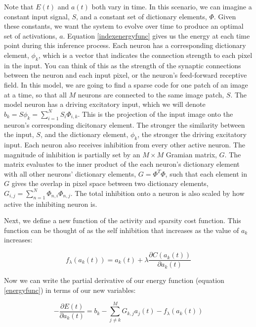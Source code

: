 Note that $E(t)$ and $a(t)$ both vary in time. In this scenario, we can imagine a constant input signal, $S$, and a constant set of dictionary elements, $\Phi$. Given these constants, we want the system to evolve over time to produce an optimal set of activations, $a$. Equation \eqref{indexenergyfunc} gives us the energy at each time point during this inference process. Each neuron has a corresponding dictionary element, $\phi_{k}$, which is a vector that indicates the connection strength to each pixel in the input. You can think of this as the strength of the synaptic connections between the neuron and each input pixel, or the neuron's feed-forward receptive field. In this model, we are going to find a sparse code for one patch of an image at a time, so that all $M$ neurons are connected to the same image patch, $S$. The model neuron has a driving excitatory input, which we will denote $b_{k} = S\phi_{k} = \sum_{i=1}^{N}S_{i} \Phi_{i,k}$. This is the projection of the input image onto the neuron's corresponding dicitonary element. The stronger the similarity between the input, $S$, and the dictionary element, $\phi_{k}$, the stronger the driving excitatory input. Each neuron also receives inhibition from every other active neuron. The magnitude of inhibition is partially set by an $M \times M$ Gramian matrix, $G$. The matrix evaluates to the inner product of the each neuron's dictionary element with all other neurons' dictionary elements, $G = \Phi^T\Phi$, such that each element in $G$ gives the overlap in pixel space between two dictionary elements, $G_{i,j} = \sum\limits_{n=1}^{N} \Phi_{n,i}\Phi_{n,j}$. The total inhibition onto a neuron is also scaled by how active the inhibiting neuron is.

Next, we define a new function of the activity and sparsity cost function. This function can be thought of as the self inhibition that increases as the value of $a_{k}$ increases:

\begin{equation}
f_{\lambda}(a_{k}(t)) = a_{k}(t) + \lambda \frac{\partial C(a_{k}(t))}{\partial a_{k}(t)}
\label{hopfieldtfunc}
\end{equation}

Now we can write the partial derivative of our energy function (equation \eqref{energyfunc}) in terms of our new variables:

\begin{equation}
    - \frac{\partial E(t)}{\partial a_{k}(t)} =
    b_{k} -
    \sum\limits_{j \neq k}^{M} G_{k,j} a_{j}(t) -
    f_{\lambda}(a_{k}(t))
\label{dedasimple}
\end{equation}

